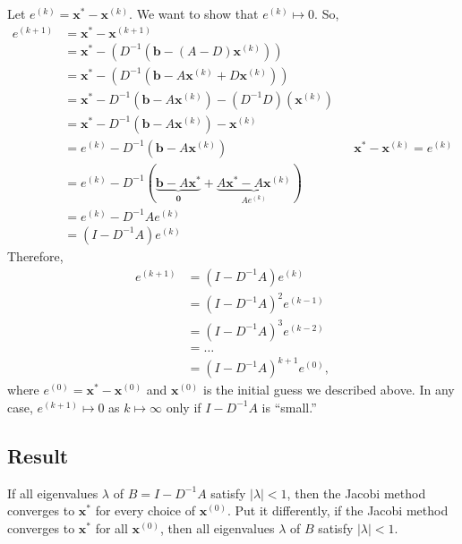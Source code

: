 \documentclass[letterpaper]{article}
\newcommand{\0}{\mathbf{0}}
\renewcommand{\b}{\mathbf{b}}
\newcommand{\x}{\mathbf{x}}
\begin{document}
\bigskip 

Let $e^{(k)} = \x^* - \x^{(k)}$. We want to show that $e^{(k)} \mapsto 0$. So, 
\begin{equation*}
    \begin{aligned}
        e^{(k + 1)} &= \x^* - \x^{(k + 1)} \\ 
            &= \x^* - (D^{-1} (\b - (A - D)\x^{(k)})) \\ 
            &= \x^* - (D^{-1} (\b - A\x^{(k)} + D\x^{(k)})) \\ 
            &= \x^* - D^{-1} (\b - A\x^{(k)}) - (D^{-1}D)(\x^{(k)}) \\ 
            &= \x^* - D^{-1} (\b - A\x^{(k)}) - \x^{(k)} \\ 
            &= e^{(k)} - D^{-1} (\b - A\x^{(k)}) && \x^* - \x^{(k)} = e^{(k)} \\
            &= e^{(k)} - D^{-1} (\underbrace{\b - A\x^*}_{\0} + \underbrace{A\x^* - A\x^{(k)}}_{Ae^{(k)}}) \\ 
            &= e^{(k)} - D^{-1}Ae^{(k)} \\ 
            &= (I - D^{-1}A)e^{(k)} 
    \end{aligned}
\end{equation*}
Therefore, 
\begin{equation*}
    \begin{aligned}
        e^{(k + 1)} &= (I - D^{-1}A)e^{(k)}  \\ 
            &= (I - D^{-1} A)^2 e^{(k - 1)} \\ 
            &= (I - D^{-1} A)^3 e^{(k - 2)} \\ 
            &= \hdots \\ 
            &= (I - D^{-1} A)^{k + 1} e^{(0)},
    \end{aligned}
\end{equation*}
where $e^{(0)} = \x^* - \x^{(0)}$ and $\x^{(0)}$ is the initial guess we described above. In any case, $e^{(k + 1)} \mapsto 0$ as $k \mapsto \infty$ only if $I - D^{-1}A$ is ``small.''

\subsection{Result}
If all eigenvalues $\lambda$ of $B = I - D^{-1}A$ satisfy $|\lambda| < 1$, then the Jacobi method converges to $\x^*$ for every choice of $\x^{(0)}$. Put it differently, if the Jacobi method converges to $\x^*$ for all $\x^{(0)}$, then all eigenvalues $\lambda$ of $B$ satisfy $|\lambda| < 1$. 
\end{document}
